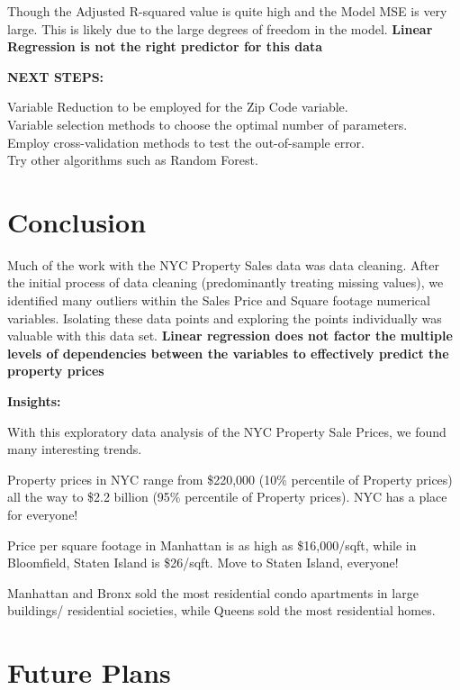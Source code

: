 \documentclass[
  a3paper,
]{article}
\begin{document}
Though the Adjusted R-squared value is quite high and the Model MSE is
very large. This is likely due to the large degrees of freedom in the
model. \textbf{Linear Regression is not the right predictor for this
data}

\textbf{NEXT STEPS:}

Variable Reduction to be employed for the Zip Code variable.\\
Variable selection methods to choose the optimal number of parameters.\\
Employ cross-validation methods to test the out-of-sample error.\\
Try other algorithms such as Random Forest.

\newpage

\hypertarget{conclusion}{%
\section{\texorpdfstring{\textbf{Conclusion}}{Conclusion}}\label{conclusion}}

Much of the work with the NYC Property Sales data was data cleaning.
After the initial process of data cleaning (predominantly treating
missing values), we identified many outliers within the Sales Price and
Square footage numerical variables. Isolating these data points and
exploring the points individually was valuable with this data set.
\textbf{Linear regression does not factor the multiple levels of
dependencies between the variables to effectively predict the property
prices}

\textbf{Insights:}

With this exploratory data analysis of the NYC Property Sale Prices, we
found many interesting trends.

Property prices in NYC range from \$220,000 (10\% percentile of Property
prices) all the way to \$2.2 billion (95\% percentile of Property
prices). NYC has a place for everyone!

Price per square footage in Manhattan is as high as \$16,000/sqft, while
in Bloomfield, Staten Island is \$26/sqft. Move to Staten Island,
everyone!

Manhattan and Bronx sold the most residential condo apartments in large
buildings/ residential societies, while Queens sold the most residential
homes.

\hypertarget{future-plans}{%
\section{\texorpdfstring{\textbf{Future
Plans}}{Future Plans}}\label{future-plans}}
\end{document}
